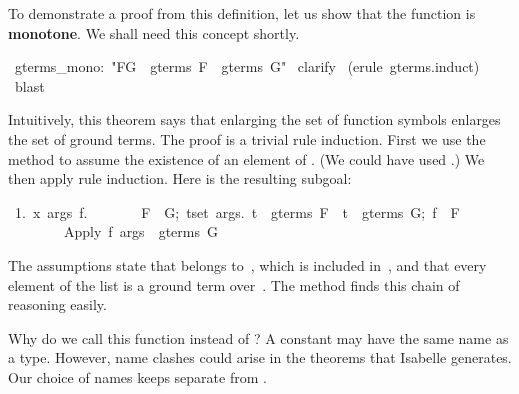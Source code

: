To demonstrate a proof from this definition, let us 
show that the function 
is \textbf{monotone}.  We shall need this concept shortly.
\begin{isabelle}
\ gterms_mono:\ "F\isasymsubseteq G\ \isasymLongrightarrow \ gterms\ F\ \isasymsubseteq \ gterms\ G"\isanewline
{}\ clarify\isanewline
{}\ (erule\ gterms.induct)\isanewline
{}\ blast\isanewline
{}
\end{isabelle}
Intuitively, this theorem says that
enlarging the set of function symbols enlarges the set of ground 
terms. The proof is a trivial rule induction.
First we use the  method to assume the existence of an element of
.  (We could have used .)  We then
apply rule induction. Here is the resulting subgoal: 
\begin{isabelle}
\ 1.\ \isasymAnd x\ args\ f.\isanewline
\ \ \ \ \ \ \ \isasymlbrakk F\ \isasymsubseteq \ G;\ \isasymforall t\isasymin set\ args.\ t\ \isasymin \ gterms\ F\ \isasymand \ t\ \isasymin \ gterms\ G;\ f\ \isasymin \ F\isasymrbrakk \isanewline
\ \ \ \ \ \ \ \isasymLongrightarrow \ Apply\ f\ args\ \isasymin \ gterms\ G%
\end{isabelle}
%
The assumptions state that  belongs 
to~, which is included in~, and that every element of the list  is
a ground term over~.  The  method finds this chain of reasoning easily.  

\begin{warn}
Why do we call this function  instead 
of {}?  A constant may have the same name as a type.  However,
name  clashes could arise in the theorems that Isabelle generates. 
Our choice of names keeps {} separate from 
{}.
\end{warn}

